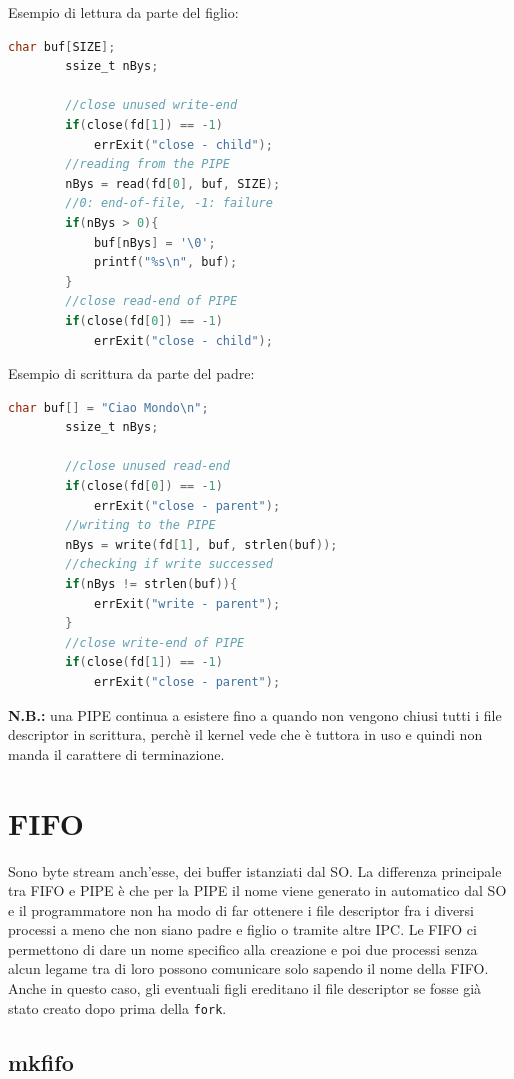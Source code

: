 \documentclass[a4paper, 12pt]{book}
\begin{document}
    Esempio di lettura da parte del figlio:
    \begin{lstlisting}[language=C]
        char buf[SIZE];
        ssize_t nBys;

        //close unused write-end 
        if(close(fd[1]) == -1)
            errExit("close - child");
        //reading from the PIPE 
        nBys = read(fd[0], buf, SIZE);
        //0: end-of-file, -1: failure 
        if(nBys > 0){
            buf[nBys] = '\0';
            printf("%s\n", buf);
        }
        //close read-end of PIPE 
        if(close(fd[0]) == -1)
            errExit("close - child");
    \end{lstlisting}    

    Esempio di scrittura da parte del padre:
    \begin{lstlisting}[language=C]
        char buf[] = "Ciao Mondo\n";
        ssize_t nBys;

        //close unused read-end 
        if(close(fd[0]) == -1)
            errExit("close - parent");
        //writing to the PIPE 
        nBys = write(fd[1], buf, strlen(buf));
        //checking if write successed 
        if(nBys != strlen(buf)){
            errExit("write - parent");
        }
        //close write-end of PIPE 
        if(close(fd[1]) == -1)
            errExit("close - parent");
    \end{lstlisting}    
    \textbf{N.B.:} una PIPE continua a esistere fino a quando 
    non vengono chiusi tutti i file descriptor in scrittura, 
    perchè il kernel vede che è tuttora in uso e quindi 
    non manda il carattere di terminazione.

    \section{FIFO}

    Sono byte stream anch'esse, dei buffer istanziati dal SO.
    La differenza principale tra FIFO e PIPE è che per la 
    PIPE il nome viene generato in automatico dal SO e 
    il programmatore non ha modo di far ottenere i file descriptor
    fra i diversi processi a meno che non siano padre e 
    figlio o tramite altre IPC. Le FIFO ci permettono 
    di dare un nome specifico alla creazione e poi due 
    processi senza alcun legame tra di loro possono 
    comunicare solo sapendo il nome della FIFO. Anche in 
    questo caso, gli eventuali figli ereditano il file 
    descriptor se fosse già stato creato dopo prima della 
    \verb|fork|.

    \subsection{mkfifo}
\end{document}
